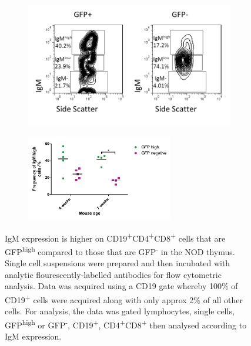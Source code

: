 \begin{figure}
	\begin{subfigure}{\textwidth}
	\includegraphics[width=\textwidth]{Figures/IgMallpos.png}
	\caption{}
	\label{subfig:IgMallpos}
	\end{subfigure}
	\begin{subfigure}{\textwidth}
	\centering
	\includegraphics[width=0.7\textwidth]{Figures/IgMhighGFP.pdf}
	\caption{}
	\label{subfig:IgMallposgraph}
	\end{subfigure}
\caption[IgM expression is higher on CD19\textsuperscript{+}CD4\textsuperscript{+}CD8\textsuperscript{+} cells that are GFP\textsuperscript{high} compared to those that are GFP\textsuperscript{-} in the NOD thymus]{IgM expression is higher on CD19\textsuperscript{+}CD4\textsuperscript{+}CD8\textsuperscript{+} cells that are GFP\textsuperscript{high} compared to those that are GFP\textsuperscript{-} in the NOD thymus.
Single cell suspensions were prepared and then incubated with analytic flourescently-labelled antibodies for flow cytometric analysis.
Data was acquired using a CD19 gate whereby 100\% of CD19\textsuperscript{+} cells were acquired along with only approx 2\% of all other cells. For analysis, the data was gated lymphocytes, single cells, GFP\textsuperscript{high} or GFP\textsuperscript{-}, CD19\textsuperscript{+}, CD4\textsuperscript{+}CD8\textsuperscript{+} then analysed according to IgM expression.
}
\end{figure}
